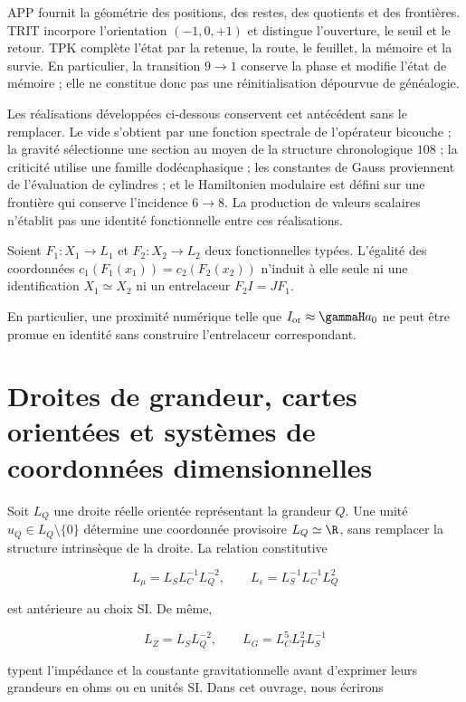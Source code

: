 APP fournit la géométrie des positions, des restes, des quotients et des
frontières. TRIT incorpore l’orientation \((-1,0,+1)\) et distingue
l’ouverture, le seuil et le retour. TPK complète l’état par la retenue, la route,
le feuillet, la mémoire et la survie. En particulier, la transition \(9\to1\)
conserve la phase et modifie l’état de mémoire ; elle ne constitue donc pas
une réinitialisation dépourvue de généalogie.

Les réalisations développées ci-dessous conservent cet antécédent sans le remplacer. Le vide s’obtient par une fonction spectrale de l’opérateur bicouche ; la gravité sélectionne une section au moyen de la structure chronologique \(108\) ; la criticité utilise une famille dodécaphasique ; les constantes de Gauss proviennent de l’évaluation de cylindres ; et le Hamiltonien modulaire est défini sur une frontière qui conserve l’incidence \(6\to8\). La production de valeurs scalaires n’établit pas une identité fonctionnelle entre ces réalisations.

\begin{proposition}
Soient \(F_1:X_1\to L_1\) et \(F_2:X_2\to L_2\) deux fonctionnelles typées.
L’égalité des coordonnées \(c_1(F_1(x_1))=c_2(F_2(x_2))\) n’induit à elle
seule ni une identification \(X_1\simeq X_2\) ni un entrelaceur
\(F_2I=JF_1\).
\end{proposition}

En particulier, une proximité numérique telle que
\(I_{\rm or}\approx\gammaH a_0\) ne peut être promue en identité sans
construire l’entrelaceur correspondant.

\section{Droites de grandeur, cartes orientées et systèmes de coordonnées dimensionnelles}

Soit \(L_Q\) une droite réelle orientée représentant la grandeur \(Q\).
Une unité \(u_Q\in L_Q\setminus\{0\}\) détermine une coordonnée
provisoire \(L_Q\simeq\R\), sans remplacer la structure intrinsèque de
la droite. La relation constitutive

\[
L_\mu=L_S L_C^{-1}L_Q^{-2},\qquad
L_\varepsilon=L_S^{-1}L_C^{-1}L_Q^2
\]

est antérieure au choix SI. De même,

\[
L_Z=L_SL_Q^{-2},\qquad L_G=L_C^5L_T^2L_S^{-1}
\]

typent l’impédance et la constante gravitationnelle avant d’exprimer leurs grandeurs en
ohms ou en unités SI. Dans cet ouvrage, nous écrirons


